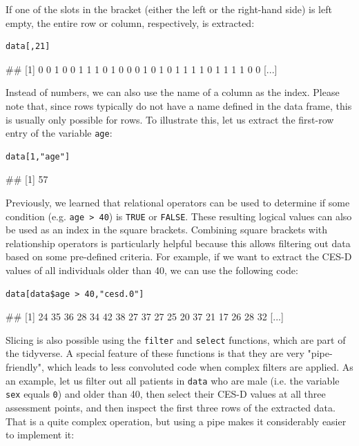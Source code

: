 If one of the slots in the bracket (either the left or the right-hand side) is left empty, the entire row or column, respectively, is extracted:

\begin{lstlisting}
data[,21]
\end{lstlisting}
\begin{example}
## [1] 0 0 1 0 0 1 1 1 0 1 0 0 0 1 0 1 0 1 1 1 1 0 1 1 1 1 0 0 [...]
\end{example}

Instead of numbers, we can also use the name of a column as the index. Please note that, since rows typically do not have a name defined in the data frame, this is usually only possible for rows. To illustrate this, let us extract the first-row entry of the variable \texttt{age}:

\begin{lstlisting}
data[1,"age"]
\end{lstlisting}
\begin{example}
## [1] 57
\end{example}

Previously, we learned that relational operators can be used to determine if some condition (e.g. \texttt{age > 40}) is \texttt{TRUE} or \texttt{FALSE}. These resulting logical values can also be used as an index in the square brackets. Combining square brackets with relationship operators is particularly helpful because this allows filtering out data based on some pre-defined criteria. For example, if we want to extract the CES-D values of all individuals older than 40, we can use the following code:

\begin{lstlisting}
data[data$age > 40,"cesd.0"]
\end{lstlisting}
\begin{example}
## [1] 24 35 36 28 34 42 38 27 37 27 25 20 37 21 17 26 28 32 [...]
\end{example}

Slicing is also possible using the \texttt{filter} and \texttt{select} functions, which are part of the tidyverse. A special feature of these functions is that they are very "pipe-friendly", which leads to less convoluted code when complex filters are applied. As an example, let us filter out all patients in \texttt{data} who are male (i.e. the variable \texttt{sex} equals \texttt{0}) and older than 40, then select their CES-D values at all three assessment points, and then inspect the first three rows of the extracted data. That is a quite complex operation, but using a pipe makes it considerably easier to implement it:

